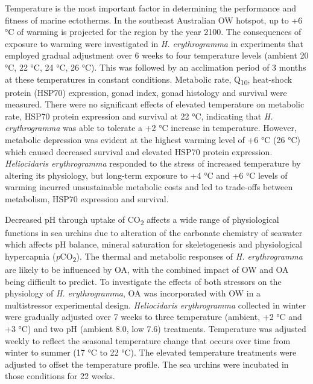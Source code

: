 \documentclass[a4paper,10pt, oneside]{memoir}
\begin{document}
Temperature is the most important factor in determining the performance and fitness of marine ectotherms.
In the southeast Australian OW hotspot, up to +6 °C of warming is projected for the region by the year 2100.
The consequences of exposure to warming were investigated in \emph{H. erythrogramma} in experiments that employed gradual adjustment over 6 weeks to four temperature levels (ambient 20 °C, 22 °C, 24 °C, 26 °C). This was followed by an acclimation period of 3 months at these temperatures in constant conditions.
Metabolic rate, Q\textsubscript{10}, heat-shock protein (HSP70) expression, gonad index, gonad histology and survival were measured.
There were no significant effects of elevated temperature on metabolic rate, HSP70 protein expression and survival at 22 °C, indicating that \emph{H. erythrogramma} was able to tolerate a +2 °C increase in temperature.
However, metabolic depression was evident at the highest warming level of +6 °C (26 °C) which caused decreased survival and elevated HSP70 protein expression.
\emph{Heliocidaris erythrogramma} responded to the stress of increased temperature by altering its physiology, but long-term exposure to +4 °C and +6 °C levels of warming incurred unsustainable metabolic costs and led to trade-offs between metabolism, HSP70 expression and survival.

Decreased pH through uptake of CO\textsubscript{2} affects a wide range of physiological functions in sea urchins due to alteration of the carbonate chemistry of seawater which affects pH balance, mineral saturation for skeletogenesis and physiological hypercapnia (\textit{p}CO\textsubscript{2}).
The thermal and metabolic responses of \emph{H. erythrogramma} are likely to be influenced by OA, with the combined impact of OW and OA being difficult to predict.
To investigate the effects of both stressors on the physiology of \emph{H. erythrogramma}, OA was incorporated with OW in a multistressor experimental design.
\emph{Heliocidaris erythrogramma} collected in winter were gradually adjusted over 7 weeks to three temperature (ambient, +2 °C and +3 °C) and two pH (ambient 8.0, low 7.6) treatments.
Temperature was adjusted weekly to reflect the seasonal temperature change that occurs over time from winter to summer (17 °C to 22 °C).
The elevated temperature treatments were adjusted to offset the temperature profile.
The sea urchins were incubated in those conditions for 22 weeks.
\end{document}
